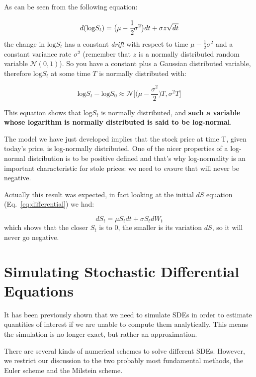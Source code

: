 As can be seen from the following equation:

\begin{equation}
d(\textrm{log} S_t) = \big(\mu - \cfrac{1}{2}\sigma^2\big)dt + \sigma z\sqrt{dt}
\end{equation}
the change in \(\textrm{log} S_t\) has a constant \emph{drift} with respect to time \(\mu - \frac{1}{2}\sigma^2\) and a constant variance rate \(\sigma^2\)
(remember that \(z\) is a normally distributed random variable
\(\mathcal{N}(0,1)\)). So you have a constant plus a Gaussian
distributed variable, therefore \(\textrm{log} S_t\) at some time \(T\)
is normally distributed with:

\begin{equation}
\textrm{log}S_t - \textrm{log}S_0 \approx\mathcal{N}\big[\big(\mu-\frac{\sigma^2}{2}\big)T, \sigma^2 T\big]
\end{equation}

This equation shows that \(\textrm{log}S_t\) is normally distributed,
and \textbf{such a variable whose logarithm is normally distributed is said
to be log-normal}. 

The model we have just developed implies that
the stock price at time T, given today's price, is log-normally
distributed. One of the nicer properties of a log-normal distribution is to be positive defined and that's why log-normality is an important characteristic for stole prices: we need to \emph{ensure} that will never be negative. 

Actually this result was expected, in fact looking at the initial \(dS\) equation (Eq.~\ref{eq:differential}) we had:

\begin{equation}
dS_t = \mu S_tdt + \sigma S_t dW_t
\end{equation}
which shows that the closer \(S_t\) is to 0, the smaller is its variation \(dS\), so it will never go negative.

\section {Simulating Stochastic Differential Equations}
It has been previously shown that we need to simulate SDEs in order to estimate 
quantities of interest if we are unable to compute them analytically. 
This means the simulation is no longer exact, but rather an approximation.

There are several kinds of numerical schemes to solve different SDEs. 
However, we restrict our discussion to the two probably most fundamental methods, 
the Euler scheme and the Milstein scheme. 


